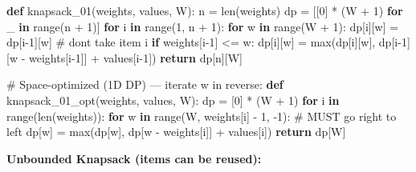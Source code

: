 \documentclass[11pt]{article}
\newenvironment{Shaded}{\begin{snugshade}}{\end{snugshade}}
\newcommand{\BuiltInTok}[1]{\textcolor[rgb]{0.50,0.55,0.55}{#1}}
\newcommand{\CommentTok}[1]{\textcolor[rgb]{0.48,0.49,0.49}{#1}}
\newcommand{\ControlFlowTok}[1]{\textcolor[rgb]{0.99,0.74,0.29}{\textbf{#1}}}
\newcommand{\DecValTok}[1]{\textcolor[rgb]{0.96,0.45,0.00}{#1}}
\newcommand{\KeywordTok}[1]{\textcolor[rgb]{0.81,0.81,0.76}{\textbf{#1}}}
\newcommand{\NormalTok}[1]{\textcolor[rgb]{0.81,0.81,0.76}{#1}}
\newcommand{\OperatorTok}[1]{\textcolor[rgb]{0.81,0.81,0.76}{#1}}
\begin{document}
\begin{Shaded}
\begin{Highlighting}[]
\KeywordTok{def}\NormalTok{ knapsack\_01(weights, values, W):}
\NormalTok{    n }\OperatorTok{=} \BuiltInTok{len}\NormalTok{(weights)}
\NormalTok{    dp }\OperatorTok{=}\NormalTok{ [[}\DecValTok{0}\NormalTok{] }\OperatorTok{*}\NormalTok{ (W }\OperatorTok{+} \DecValTok{1}\NormalTok{) }\ControlFlowTok{for}\NormalTok{ \_ }\KeywordTok{in} \BuiltInTok{range}\NormalTok{(n }\OperatorTok{+} \DecValTok{1}\NormalTok{)]}
    \ControlFlowTok{for}\NormalTok{ i }\KeywordTok{in} \BuiltInTok{range}\NormalTok{(}\DecValTok{1}\NormalTok{, n }\OperatorTok{+} \DecValTok{1}\NormalTok{):}
        \ControlFlowTok{for}\NormalTok{ w }\KeywordTok{in} \BuiltInTok{range}\NormalTok{(W }\OperatorTok{+} \DecValTok{1}\NormalTok{):}
\NormalTok{            dp[i][w] }\OperatorTok{=}\NormalTok{ dp[i}\OperatorTok{{-}}\DecValTok{1}\NormalTok{][w]   }\CommentTok{\# don\textquotesingle{}t take item i}
            \ControlFlowTok{if}\NormalTok{ weights[i}\OperatorTok{{-}}\DecValTok{1}\NormalTok{] }\OperatorTok{\textless{}=}\NormalTok{ w:}
\NormalTok{                dp[i][w] }\OperatorTok{=} \BuiltInTok{max}\NormalTok{(dp[i][w], dp[i}\OperatorTok{{-}}\DecValTok{1}\NormalTok{][w }\OperatorTok{{-}}\NormalTok{ weights[i}\OperatorTok{{-}}\DecValTok{1}\NormalTok{]] }\OperatorTok{+}\NormalTok{ values[i}\OperatorTok{{-}}\DecValTok{1}\NormalTok{])}
    \ControlFlowTok{return}\NormalTok{ dp[n][W]}

\CommentTok{\# Space{-}optimized (1D DP) — iterate w in reverse:}
\KeywordTok{def}\NormalTok{ knapsack\_01\_opt(weights, values, W):}
\NormalTok{    dp }\OperatorTok{=}\NormalTok{ [}\DecValTok{0}\NormalTok{] }\OperatorTok{*}\NormalTok{ (W }\OperatorTok{+} \DecValTok{1}\NormalTok{)}
    \ControlFlowTok{for}\NormalTok{ i }\KeywordTok{in} \BuiltInTok{range}\NormalTok{(}\BuiltInTok{len}\NormalTok{(weights)):}
        \ControlFlowTok{for}\NormalTok{ w }\KeywordTok{in} \BuiltInTok{range}\NormalTok{(W, weights[i] }\OperatorTok{{-}} \DecValTok{1}\NormalTok{, }\OperatorTok{{-}}\DecValTok{1}\NormalTok{):   }\CommentTok{\# MUST go right to left}
\NormalTok{            dp[w] }\OperatorTok{=} \BuiltInTok{max}\NormalTok{(dp[w], dp[w }\OperatorTok{{-}}\NormalTok{ weights[i]] }\OperatorTok{+}\NormalTok{ values[i])}
    \ControlFlowTok{return}\NormalTok{ dp[W]}
\end{Highlighting}
\end{Shaded}

\textbf{Unbounded Knapsack (items can be reused):}
\end{document}
